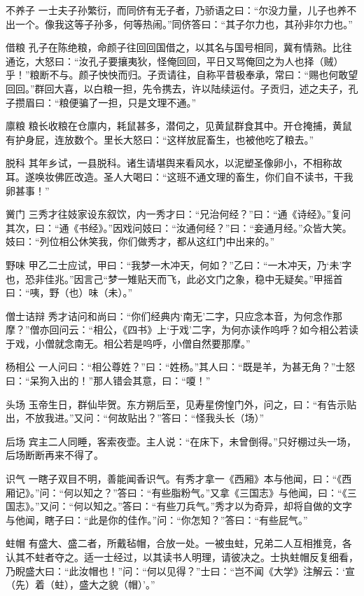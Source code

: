 \documentclass[12pt,UTF8]{ctexbook}
\begin{document}
不养子
一士夫子孙繁衍，而同侪有无子者，乃骄语之曰：“尔没力量，儿子也养不出一个。像我这等子孙多，何等热闹。”同侪答曰：“其子尔力也，其孙非尔力也。”

借粮
孔子在陈绝粮，命颜子往回回国借之，以其名与国号相同，冀有情熟。比往通讫，大怒曰：“汝孔子要攘夷狄，怪俺回回，平日又骂俺回之为人也择（贼）乎！”粮断不与。颜子怏怏而归。子贡请往，自称平昔极奉承，常曰：“赐也何敢望回回。”群回大喜，以白粮一担，先令携去，许以陆续运付。子贡归，述之夫子，孔子攒眉曰：“粮便骗了一担，只是文理不通。”

廪粮
粮长收粮在仓廪内，耗鼠甚多，潜伺之，见黄鼠群食其中。开仓掩捕，黄鼠有护身屁，连放数个。里长大怒曰：“这样放屁畜生，也被他吃了粮去。”

脱科
其年乡试，一县脱科。诸生请堪舆来看风水，以泥塑圣像卵小，不相称故耳。遂唤妆佛匠改造。圣人大喝曰：“这班不通文理的畜生，你们自不读书，干我卵甚事！”

黉门
三秀才往妓家设东叙饮，内一秀才曰：“兄治何经？”曰：“通《诗经》。”复问其次，曰：“通《书经》。”因戏问妓曰：“汝通何经？”曰：“妾通月经。”众皆大笑。妓曰：“列位相公休笑我，你们做秀才，都从这红门中出来的。”

野味
甲乙二士应试，甲曰：“我梦一木冲天，何如？”乙曰：“一木冲天，乃‘未’字也，恐非佳兆。”因言己“梦一雉贴天而飞，此必文门之象，稳中无疑矣。”甲摇首曰：“咦，野（也）味（未）。”

僧士诘辩
秀才诘问和尚曰：“你们经典内‘南无’二字，只应念本音，为何念作那摩？”僧亦回问云：“相公，《四书》上‘于戏’二字，为何亦读作呜呼？如今相公若读于戏，小僧就念南无。相公若是呜呼，小僧自然要那摩。”

杨相公
一人问曰：“相公尊姓？”曰：“姓杨。”其人曰：“既是羊，为甚无角？”士怒曰：“呆狗入出的！”那人错会其意，曰：“嗄！”

头场
玉帝生日，群仙毕贺。东方朔后至，见寿星傍惶门外，问之，曰：“有告示贴出，不放我进。”又问：“何故贴出？”答曰：“怪我头长（场）”

后场
宾主二人同睡，客索夜壶。主人说：“在床下，未曾倒得。”只好棚过头一场，后场断断再来不得了。

识气
一瞎子双目不明，善能闻香识气。有秀才拿一《西厢》本与他闻，曰：“《西厢记》。”问：“何以知之？”答曰：“有些脂粉气。”又拿《三国志》与他闻，曰：“《三国志》。”又问：“何以知之。”答曰：“有些刀兵气。”秀才以为奇异，却将自做的文字与他闻，瞎子曰：“此是你的佳作。”问：“你怎知？”答曰：“有些屁气。”

蛀帽
有盛大、盛二者，所戴毡帽，合放一处。一被虫蛀，兄弟二人互相推竞，各认其不蛀者夺之。适一士经过，以其读书人明理，请彼决之。士执蛀帽反复细看，乃睨盛大曰：“此汝帽也！”问：“何以见得？”士曰：“岂不闻《大学》注解云：‘宣（先）着（蛀），盛大之貌（帽）’。”
\end{document}
